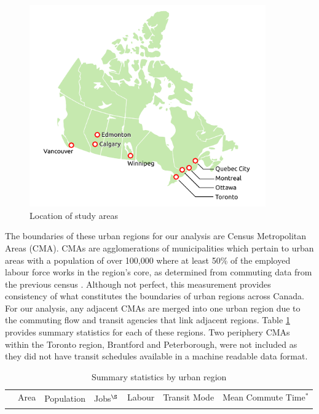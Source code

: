 \documentclass[11 pt, letterpaper]{article}
\begin{document}
{\begin{figure}[H]
	\vspace{4mm}
	\caption{Location of study areas} 
	\label{canada}
	\centerline{\includegraphics[width=4in]{figures/canada/canada.pdf}}
	\vspace{1mm}
\end{figure}

The boundaries of these urban regions for our analysis are Census Metropolitan Areas (CMA). CMAs are agglomerations of municipalities which pertain to urban areas with a population of over 100,000 where at least 50\% of the employed labour force works in the region's core, as determined from commuting data from the previous census \cite{sc2016cdic}. Although not perfect, this measurement provides consistency of what constitutes the boundaries of urban regions across Canada. For our analysis, any adjacent CMAs are merged into one urban region due to the commuting flow and transit agencies that link adjacent regions. Table \ref{desc_table} provides summary statistics for each of these regions. Two periphery CMAs within the Toronto region, Brantford and Peterborough, were not included as they did not have transit schedules available in a machine readable data format.

\begin{table}[H]
	\vspace{4mm}
	\begin{adjustwidth}{-.25in}{-.25in} 
		\renewcommand{\arraystretch}{0.75} %
		\small
		\caption{Summary statistics by urban region}
		\label{desc_table}
		\begin{tabular}{p{19mm} | p{10mm} p{15mm} p{14mm}  p{14mm} p{21mm} p{12mm} p{12mm}}
			\multirow{2}{*}{} & Area & \multirow{2}{*}{Population} & \multirow{2}{*}{Jobs$^\S$} & Labour & Transit Mode & \multicolumn{2}{l}{Mean Commute Time$^*$} \\ \arrayrulecolor{lightgray}\cline{7-8}
			\arrayrulecolor{black}
			

\end{tabular}
\end{adjustwidth}
\end{table}}
\end{document}
